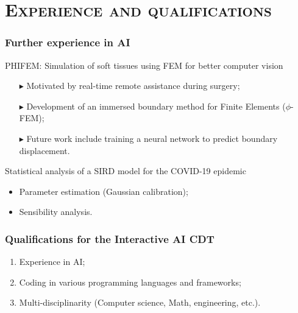

\section{\textsc{Experience and qualifications}}

\begin{frame}
    \frametitle{Further experience in AI}

    \begin{alertblock}{PHIFEM: Simulation of soft tissues using FEM for better computer vision \parencite{phifem}}
        \small
        \begin{itemize}
            \item[$\blacktriangleright$] Motivated by real-time remote assistance during surgery;
            \item[$\blacktriangleright$] Development of an immersed boundary method for Finite Elements ($\phi$-FEM);
            \item[$\blacktriangleright$] Future work include training a neural network to predict boundary displacement.
        \end{itemize}
        
        \vspace*{-0.5cm}
    \end{alertblock}

    \pause

    \begin{alertblock}{Statistical analysis of a SIRD model for the COVID-19 epidemic \parencite{covidsird}}
        \begin{itemize}
            \item Parameter estimation (Gaussian calibration);
            \item Sensibility analysis.
        \end{itemize}
    \end{alertblock}
\end{frame}


\begin{frame}
    \frametitle{Qualifications for the Interactive AI CDT}
    \begin{enumerate}
        \item Experience in AI;
        \item Coding in various programming languages and frameworks;
        \item Multi-disciplinarity (Computer science, Math, engineering, etc.).
    \end{enumerate}
\end{frame}